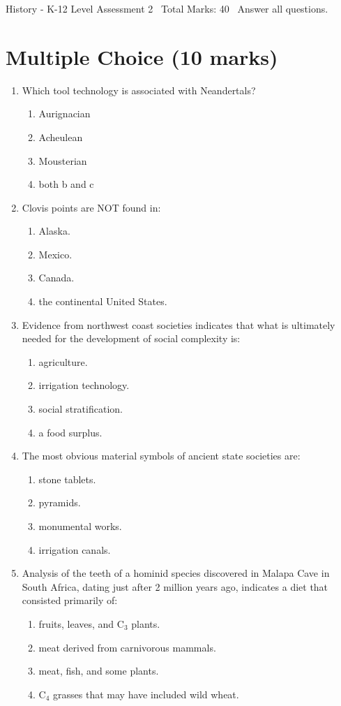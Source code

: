 \documentclass[12pt]{article}
\begin{document}
\begin{center}
History - K-12 Level Assessment 2 \
Total Marks: 40 \
Answer all questions.
\end{center}

\section*{Multiple Choice (10 marks)}
\begin{enumerate}[label=\arabic*.]
\item Which tool technology is associated with Neandertals?
\begin{enumerate}[label=(\alph*)]
    \item Aurignacian
    \item Acheulean
    \item Mousterian
    \item both b and c
\end{enumerate}
\item Clovis points are NOT found in:
\begin{enumerate}[label=(\alph*)]
    \item Alaska.
    \item Mexico.
    \item Canada.
    \item the continental United States.
\end{enumerate}
\item Evidence from northwest coast societies indicates that what is ultimately needed for the development of social complexity is:
\begin{enumerate}[label=(\alph*)]
    \item agriculture.
    \item irrigation technology.
    \item social stratification.
    \item a food surplus.
\end{enumerate}
\item The most obvious material symbols of ancient state societies are:
\begin{enumerate}[label=(\alph*)]
    \item stone tablets.
    \item pyramids.
    \item monumental works.
    \item irrigation canals.
\end{enumerate}
\item Analysis of the teeth of a hominid species discovered in Malapa Cave in South Africa, dating just after 2 million years ago, indicates a diet that consisted primarily of:
\begin{enumerate}[label=(\alph*)]
    \item fruits, leaves, and C$_{3}$ plants.
    \item meat derived from carnivorous mammals.
    \item meat, fish, and some plants.
    \item C$_{4}$ grasses that may have included wild wheat.
\end{enumerate}
\end{enumerate}
\end{document}
